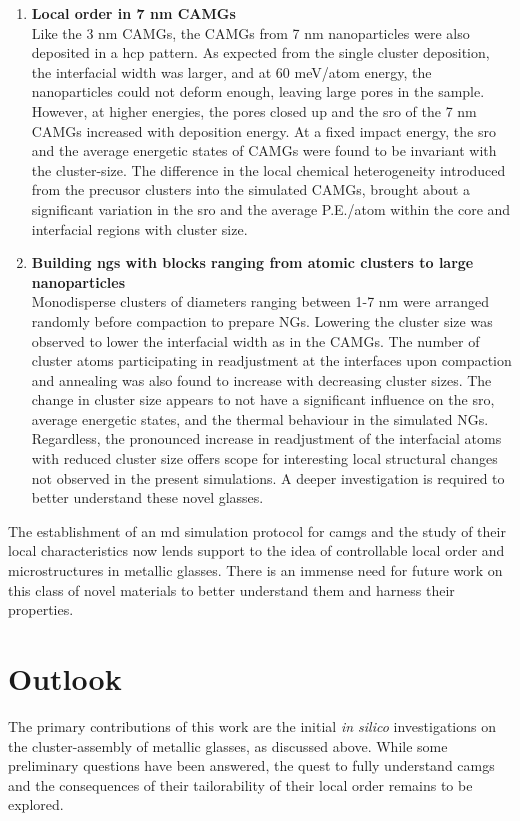 \begin{enumerate}[leftmargin=*]
\begin{enumerate}[leftmargin=*]
\item \textbf{Local order in 7 nm \cz CAMGs}\\
Like the 3 nm CAMGs, the CAMGs from 7 nm nanoparticles were also deposited in a \gls{hcp} pattern. As expected from the single cluster deposition, the interfacial width was larger, and at 60 meV/atom energy, the nanoparticles could not deform enough, leaving large pores in the sample. However, at higher energies, the pores closed up and the \gls{sro} of the 7 nm CAMGs increased with deposition energy. At a fixed impact energy, the \gls{sro} and the average energetic states of CAMGs were found to be invariant with the cluster-size. The difference in the local chemical heterogeneity introduced from the precusor clusters into the simulated CAMGs, brought about a significant variation in the \gls{sro} and the average P.E./atom within the core and interfacial regions with cluster size. 

\item \textbf{Building \gls{ng}s with blocks ranging from atomic clusters to large nanoparticles} \\
Monodisperse clusters of diameters ranging between 1-7 nm were arranged randomly before compaction to prepare \cz NGs. Lowering the cluster size was observed to lower the interfacial width as in the CAMGs. The number of cluster atoms participating in readjustment at the interfaces upon compaction and annealing was also found to increase with decreasing cluster sizes. The change in cluster size appears to not have a significant influence on the \gls{sro}, average energetic states, and the thermal behaviour in the simulated NGs. Regardless, the pronounced increase in readjustment of the interfacial atoms with reduced cluster size offers scope for interesting local structural changes not observed in the present simulations. A deeper investigation is required to better understand these novel glasses. 
\end{enumerate}
\end{enumerate}

The establishment of an \gls{md} simulation protocol for \gls{camg}s and the study of their local characteristics now lends support to the idea of controllable local order and microstructures in metallic glasses. There is an immense need for future work on this class of novel materials to better understand them and harness their properties.

\clearpage
\section{Outlook}
The primary contributions of this work are the initial \textit{in silico} investigations on the cluster-assembly of metallic glasses, as discussed above. While some preliminary questions have been answered, the quest to fully understand \gls{camg}s and the consequences of their tailorability of their local order remains to be explored.

